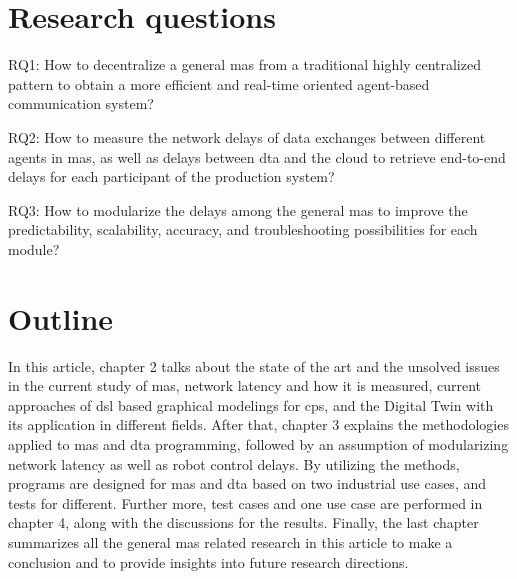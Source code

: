 \section{Research questions}
RQ1: How to decentralize a general \gls{mas} from a traditional highly 
centralized pattern to obtain a more efficient and real-time oriented agent-based 
communication system?

RQ2: How to measure the network delays of data exchanges between 
different agents in \gls{mas}, as well as delays between \gls{dta} and the cloud 
to retrieve end-to-end delays for each participant of the production system?

RQ3: How to modularize the delays among the general \gls{mas} to improve the 
predictability, scalability, accuracy, and troubleshooting possibilities for 
each module?  



\section{Outline}
In this article, chapter 2 talks about the state of the art and 
the unsolved issues in the current study of \gls{mas}, network 
latency and how it is measured, current approaches of \gls{dsl} 
based graphical modelings for \gls{cps}, and the Digital Twin with 
its application in different fields. After that, chapter 3 explains 
the methodologies applied to \gls{mas} and \gls{dta} programming, 
followed by an assumption of modularizing network latency as well 
as robot control delays. By utilizing the methods, programs are 
designed for \gls{mas} and \gls{dta} based on two industrial use cases, 
and tests for different. Further more, test cases and one use case are 
performed in chapter 4, along with 
the discussions for the results. Finally, the last chapter summarizes 
all the general \gls{mas} related research in this article to make a 
conclusion and to provide insights into future research directions.  